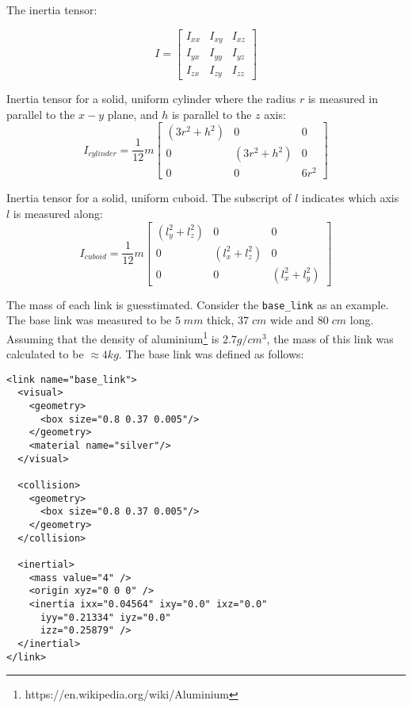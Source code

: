 The inertia tensor:

\begin{equation}
    	I = \begin{bmatrix}
    	I_{xx} & I_{xy} & I_{xz} \\[0.3em]
    	I_{yx} & I_{yy} & I_{yz} \\[0.3em]
    	I_{zx} & I_{zy} & I_{zz}
    	\end{bmatrix}
\end{equation}

Inertia tensor for a solid, uniform cylinder where the radius $r$ is measured in parallel to the $x - y$ plane, and $h$ is parallel to the $z$ axis:
\begin{equation}
I_{cylinder} = \frac{1}{12}m \begin{bmatrix}
	(3 r^2 + h^2) & 0 & 0 \\[0.3em]
	0 & (3 r^2 + h^2) & 0 \\[0.3em]
	0 & 0 & 6r^2
	\end{bmatrix}
	\label{eq:cylinder}
\end{equation}

Inertia tensor for a solid, uniform cuboid. The subscript of $l$ indicates which axis $l$ is measured along:
\begin{equation}
I_{cuboid} = \frac{1}{12}m \begin{bmatrix}
	(l_y^2 + l_z^2) & 0 & 0 \\[0.3em]
	0 & (l_x^2 + l_z^2) & 0 \\[0.3em]
	0 & 0 & (l_x^2 + l_y^2)
\end{bmatrix}
\label{eq:cuboid}
\end{equation}

The mass of each link is guesstimated. Consider the \texttt{base\_link} as an example. The base link was measured to be $5 \; mm$ thick, $37 \; cm$ wide and $80 \; cm$ long. Assuming that the density of aluminium\footnote{https://en.wikipedia.org/wiki/Aluminium} is $2.7 g/cm^3$, the mass of this link was calculated to be $\approx 4 kg$. The base link was defined as follows:

\lstset{language=XML}
\begin{lstlisting}
<link name="base_link">
  <visual>
    <geometry>
      <box size="0.8 0.37 0.005"/>
    </geometry>
    <material name="silver"/>
  </visual>
	  
  <collision>
    <geometry>
      <box size="0.8 0.37 0.005"/>
    </geometry>
  </collision>
	  
  <inertial>
    <mass value="4" />
    <origin xyz="0 0 0" />
    <inertia ixx="0.04564" ixy="0.0" ixz="0.0"
      iyy="0.21334" iyz="0.0" 
      izz="0.25879" />
  </inertial>
</link>
\end{lstlisting}

